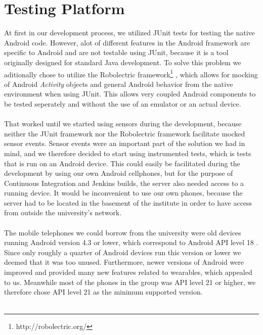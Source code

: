 
\section{Testing Platform}
\label{sub:testing_platform}

At first in our development process, we utilized JUnit tests for testing the native Android code. However, alot of different features in the Android framework are specific to Android and are not testable using JUnit, because it is a tool originally designed for standard Java development. To solve this problem we aditionally chose to utilize the Robolectric framework\footnote{http://robolectric.org/} , which allows for mocking of Android \emph{Activity} objects and general Android behavior from the native environment when using JUnit. This allows very coupled Android components to be tested seperately and without the use of an emulator or an actual device. 
\\\\
That worked until we started using sensors during the development, because neither the JUnit framework nor the Robolectric framework facilitate mocked sensor events. Sensor events were an important part of the solution we had in mind, and we therefore decided to start using instrumented tests, which is tests that is run on an Android device. This could easily be facilitated during the development by using our own Android cellphones, but for the purpose of Continuous Integration and Jenkins builds, the server also needed access to a running device. It would be inconvenient to use our own phones, because the server had to be located in the basement of the institute in order to have access from outside the university's network. 
\\\\
The mobile telephones we could borrow from the university were old devices running Android version 4.3 or lower, which correspond to Android API level 18 \parencite{uses_sdk}. Since only roughly a quarter of Android devices run this version or lower \parencite{android_dashboard} we deemed that it was too unused. Furthermore, newer versions of Android were improved and provided many new features related to wearables, which appealed to us. Meanwhile most of the phones in the group was API level 21 or higher, we therefore chose API level 21 as the minimum supported version. 
\\\\
